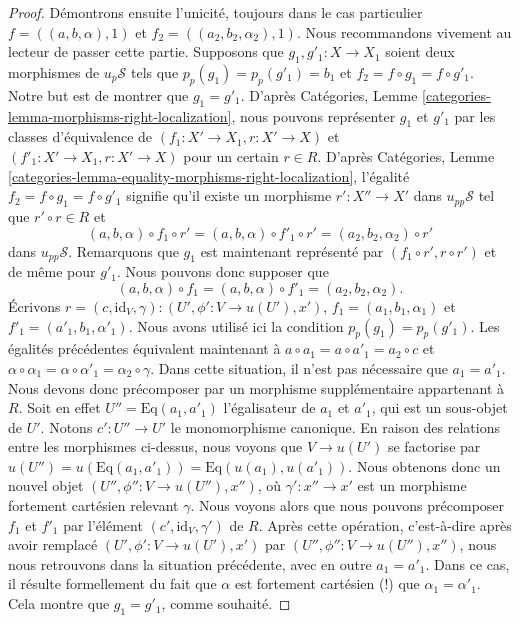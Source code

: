 \begin{proof}
\medskip\noindent
Démontrons ensuite l'unicité, toujours dans le cas particulier
$f = ((a, b, \alpha), 1)$ et $f_2 = ((a_2, b_2, \alpha_2), 1)$.
Nous recommandons vivement au lecteur de passer cette partie.
Supposons que $g_1, g'_1 : X \to X_1$ soient deux morphismes de
$u_p\mathcal{S}$ tels que $p_p(g_1) = p_p(g'_1) = b_1$ et
$f_2 = f \circ g_1 = f \circ g'_1$. Notre but est de montrer que
$g_1 = g'_1$. D'après
Catégories, Lemme \ref{categories-lemma-morphisms-right-localization},
nous pouvons représenter $g_1$ et $g'_1$ par les classes d'équivalence de
$(f_1 : X' \to X_1, r : X' \to X)$ et
$(f'_1 : X' \to X_1, r : X' \to X)$ pour un certain $r \in R$. D'après
Catégories, Lemme \ref{categories-lemma-equality-morphisms-right-localization},
l'égalité $f_2 = f \circ g_1 = f \circ g'_1$ signifie qu'il
existe un morphisme $r' : X'' \to X'$ dans $u_{pp}\mathcal{S}$ tel que
$r' \circ r \in R$ et
$$
(a, b, \alpha) \circ f_1 \circ r' =
(a, b, \alpha) \circ f'_1 \circ r' =
(a_2, b_2, \alpha_2) \circ r'
$$
dans $u_{pp}\mathcal{S}$. Remarquons que
$g_1$ est maintenant représenté par $(f_1 \circ r', r \circ r')$ et
de même pour $g'_1$. Nous pouvons donc supposer que
$$
(a, b, \alpha) \circ f_1 =
(a, b, \alpha) \circ f'_1 =
(a_2, b_2, \alpha_2).
$$
Écrivons $r = (c, \text{id}_V, \gamma) : (U', \phi' : V \to u(U'), x')$,
$f_1 = (a_1, b_1, \alpha_1)$ et $f'_1 = (a'_1, b_1, \alpha'_1)$.
Nous avons utilisé ici la condition $p_p(g_1) = p_p(g'_1)$.
Les égalités précédentes équivalent maintenant à
$a \circ a_1 = a \circ a'_1 = a_2 \circ c$ et
$\alpha \circ \alpha_1 = \alpha \circ \alpha'_1 = \alpha_2 \circ \gamma$.
Dans cette situation, il n'est pas nécessaire que $a_1 = a'_1$.
Nous devons donc précomposer par un morphisme supplémentaire appartenant à $R$.
Soit en effet $U'' = \text{Eq}(a_1, a'_1)$ l'égalisateur de
$a_1$ et $a'_1$, qui est un sous-objet de $U'$. Notons
$c' : U'' \to U'$ le monomorphisme canonique.
En raison des relations entre les morphismes
ci-dessus, nous voyons que $V \to u(U')$ se factorise par
$u(U'') = u(\text{Eq}(a_1, a'_1)) = \text{Eq}(u(a_1), u(a'_1))$.
Nous obtenons donc un nouvel objet $(U'', \phi'' : V \to u(U''), x'')$, où
$\gamma' : x'' \to x'$ est un morphisme fortement cartésien relevant $\gamma$.
Nous voyons alors que nous pouvons précomposer $f_1$ et $f'_1$ par l'élément
$(c', \text{id}_V, \gamma')$ de $R$. Après cette opération, c'est-à-dire après avoir remplacé
$(U', \phi' : V \to u(U'), x')$ par
$(U'', \phi'' : V \to u(U''), x'')$, nous nous retrouvons dans la situation
précédente, avec en outre $a_1 = a'_1$.
Dans ce cas, il résulte formellement du fait que $\alpha$
est fortement cartésien (!) que $\alpha_1 = \alpha'_1$.
Cela montre que $g_1 = g'_1$, comme souhaité.


\end{proof}
